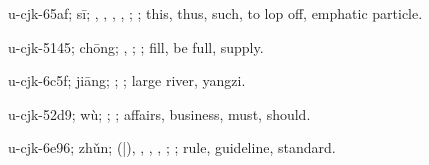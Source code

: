 \begin{multicols}{2}
{\cjkgGlue{}u-cjk-65af; sī; \cjkgGlue{}\cjkgGlue{}\cjkgGlue{}, \cjkgGlue{}, \cjkgGlue{}, \cjkgGlue{}, \cjkgGlue{}; \cjkgGlue{}; this, thus, such, to lop off, emphatic particle.

\cjkgGlue{}u-cjk-5145; chōng; \cjkgGlue{}\cjkgGlue{}\cjkgGlue{}, \cjkgGlue{}\cjkgGlue{}\cjkgGlue{}; \cjkgGlue{}; fill, be full, supply.

\cjkgGlue{}u-cjk-6c5f; jiāng; \cjkgGlue{}; \cjkgGlue{}; large river, yangzi.

\cjkgGlue{}u-cjk-52d9; wù; \cjkgGlue{}\cjkgGlue{}\cjkgGlue{}; \cjkgGlue{}; affairs, business, must, should.

\cjkgGlue{}u-cjk-6e96; zhǔn; \cjkgGlue{}\cjkgGlue{}(\cjkgGlue{}|\cjkgGlue{}), \cjkgGlue{}\cjkgGlue{}\cjkgGlue{}, \cjkgGlue{}, \cjkgGlue{}\cjkgGlue{}\cjkgGlue{}, \cjkgGlue{}; \cjkgGlue{}; rule, guideline, standard.

}
\end{multicols}
